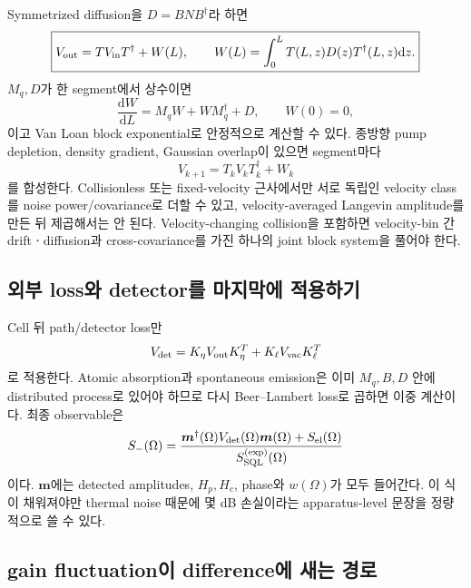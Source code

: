 \documentclass[11pt,a4paper]{article}
\newcommand{\dd}{\mathrm d}
\newcommand{\SQL}{\mathrm{SQL}}
\begin{document}
Symmetrized diffusion을 $D=BNB^\dagger$라 하면
\begin{equation}
\boxed{V_{\rm out}=TV_{\rm in}T^\dagger+W(L),\qquad
W(L)=\int_0^LT(L,z)D(z)T^\dagger(L,z)\dd z.}
\label{eq:covariance-propagation}
\end{equation}
$M_q,D$가 한 segment에서 상수이면
\begin{equation}
\frac{\dd W}{\dd L}=M_qW+WM_q^\dagger+D,\qquad W(0)=0,
\label{eq:lyapunov}
\end{equation}
이고 Van Loan block exponential로 안정적으로 계산할 수 있다. 종방향 pump depletion,
density gradient, Gaussian overlap이 있으면 segment마다
\begin{equation}
V_{k+1}=T_kV_kT_k^\dagger+W_k
\end{equation}
를 합성한다. Collisionless 또는 fixed-velocity 근사에서만 서로 독립인 velocity
class를 noise power/covariance로 더할 수 있고, velocity-averaged Langevin amplitude를
만든 뒤 제곱해서는 안 된다. Velocity-changing collision을 포함하면 velocity-bin 간
driftㆍdiffusion과 cross-covariance를 가진 하나의 joint block system을 풀어야 한다.

\subsection{외부 loss와 detector를 마지막에 적용하기}

Cell 뒤 path/detector loss만
\begin{equation}
V_{\rm det}=K_\eta V_{\rm out}K_\eta^T
+K_\ell V_{\rm vac}K_\ell^T
\end{equation}
로 적용한다. Atomic absorption과 spontaneous emission은 이미
$M_q,B,D$ 안에 distributed process로 있어야 하므로 다시 Beer--Lambert loss로
곱하면 이중 계산이다. 최종 observable은
\begin{equation}
S_-(\Omega)=
\frac{\bm m^\dagger(\Omega)V_{\rm det}(\Omega)\bm m(\Omega)
+S_{\rm el}(\Omega)}{S_{\SQL}^{(\rm exp)}(\Omega)}
\label{eq:final-observable}
\end{equation}
이다. $\bm m$에는 detected amplitudes, $H_p,H_c$, phase와 $w(\Omega)$가 모두
들어간다. 이 식이 채워져야만 thermal noise 때문에 몇 dB 손실이라는 apparatus-level
문장을 정량적으로 쓸 수 있다.

\subsection{gain fluctuation이 difference에 새는 경로}
\end{document}
